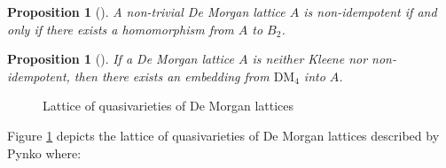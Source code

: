 \documentclass{amsart}
\theoremstyle{plain}
\newtheorem{proposition}[theorem]{Proposition}
\theoremstyle{definition}
\begin{document}
\begin{proposition}[\cite{spencer}]
    A non-trivial De Morgan lattice $A$ is non-idempotent if and only if there exists a homomorphism from $A$ to $B_2$. 
\end{proposition}
\begin{proposition}[\cite{pynko}]
    If a De Morgan lattice $A$ is neither Kleene nor non-idempotent, then there exists an embedding from $\text{DM}_4$ into $A$. 
\end{proposition}
\begin{figure}[ht]
    \centering
{}
  \caption{Lattice of quasivarieties of De Morgan lattices}
    \label{figure 1}
\end{figure}
Figure \ref{figure 1} depicts the lattice of quasivarieties of De Morgan lattices described by Pynko \cite{pynko} where:
\end{document}
